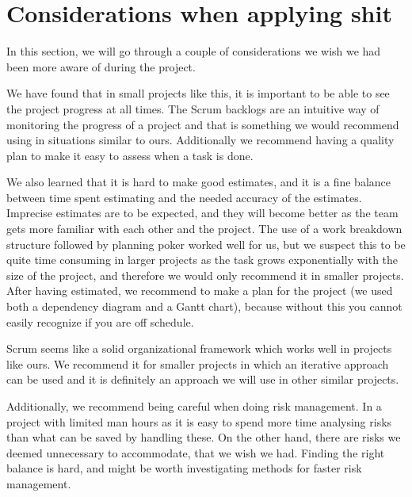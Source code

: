 \section{Considerations when applying shit}
In this section, we will go through a couple of considerations we wish we had
been more aware of during the project.

We have found that in small projects like this, it is important to be able to
see the project progress at all times. The Scrum backlogs are an intuitive way
of monitoring the progress of a project and that is something we would
recommend using in situations similar to ours. Additionally we recommend having
a quality plan to make it easy to assess when a task is done.

We also learned that it is hard to make good estimates, and it is a fine balance
between time spent estimating and the needed accuracy of the estimates. 
Imprecise estimates are to be expected, and they will become better as the team
gets more familiar with each other and the project. The use of a work breakdown
structure followed by planning poker worked well for us, but we suspect this to
be quite time consuming in larger projects as the task grows exponentially with
the size of the project, and therefore we would only recommend it in smaller
projects. After having estimated, we recommend to make a plan for the project
(we used both a dependency diagram and a Gantt chart), because without this you
cannot easily recognize if you are off schedule.

Scrum seems like a solid organizational framework which works well in projects
like ours. We recommend it for smaller projects in which an iterative approach
can be used and it is definitely an approach we will use in other similar
projects.

Additionally, we recommend being careful when doing risk management. In a
project with limited man hours as it is easy to spend more time analysing risks
than what can be saved by handling these. On the other hand, there are risks we
deemed unnecessary to accommodate, that we wish we had. Finding the right
balance is hard, and might be worth investigating methods for faster risk
management.
